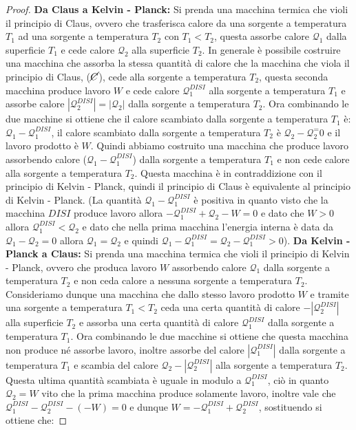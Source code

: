     \begin{proof}
        \textbf{Da Claus a Kelvin - Planck:} Si prenda una macchina termica che violi il principio di Claus, ovvero che trasferisca calore da una sorgente a temperatura $T_1$ ad una sorgente a temperatura $T_2$ con $T_1 < T_2$, questa assorbe calore $\mathcal{Q}_1$ dalla superficie $T_1$ e cede calore $\mathcal{Q}_2$ alla superficie $T_2$. In generale è possibile costruire una macchina che assorba la stessa quantità di calore che la macchina che viola il principio di Claus, ($\cancel{C}$), cede alla sorgente a temperatura $T_2$, questa seconda macchina produce lavoro $W$ e cede calore $\mathcal{Q}_1^{DISI}$ alla sorgente a temperatura $T_1$ e assorbe calore $\left|\mathcal{Q}_2^{DISI}\right| = \left|\mathcal{Q}_2\right|$ dalla sorgente a temperatura $T_2$. Ora combinando le due macchine si ottiene che il calore scambiato dalla sorgente a temperatura $T_1$ è: $\mathcal{Q}_1 - \mathcal{Q}_1^{DISI}$, il calore scambiato dalla sorgente a temperatura $T_2$ è $\mathcal{Q}_2 - \mathcal{Q}_2^ = 0$ e il lavoro prodotto è $W$. Quindi abbiamo costruito una macchina che produce lavoro assorbendo calore ($\mathcal{Q}_1 - \mathcal{Q}_1^{DISI}$) dalla sorgente a temperatura $T_1$ e non cede calore alla sorgente a temperatura $T_2$. Questa macchina è in contraddizione con il principio di Kelvin - Planck, quindi il principio di Claus è equivalente al principio di Kelvin - Planck. (La quantità $\mathcal{Q}_1 - \mathcal{Q}_1^{DISI}$ è positiva in quanto visto che la macchina $DISI$ produce lavoro allora $-\mathcal{Q}_1^{DISI}+\mathcal{Q}_2-W=0$ e dato che $W>0$ allora $\mathcal{Q}_1^{DISI} < \mathcal{Q}_2$ e dato che nella prima macchina l'energia interna è data da $\mathcal{Q}_1 - \mathcal{Q}_2 = 0$ allora $\mathcal{Q}_1 = \mathcal{Q}_2$ e quindi $\mathcal{Q}_1 - \mathcal{Q}_1^{DISI} = \mathcal{Q}_2 - \mathcal{Q}_1^{DISI} > 0$).\newline
        \textbf{Da Kelvin - Planck a Claus:} Si prenda una macchina termica che violi il principio di Kelvin - Planck, ovvero che produca lavoro $W$ assorbendo calore $\mathcal{Q}_1$ dalla sorgente a temperatura $T_2$ e non ceda calore a nessuna sorgente a temperatura $T_2$. Consideriamo dunque una macchina che dallo stesso lavoro prodotto $W$ e tramite una sorgente a temperatura $T_1<T_2$ ceda una certa quantità di calore $-\left|\mathcal{Q}_2^{DISI}\right|$ alla superficie $T_2$ e assorba una certa quantità di calore $\mathcal{Q}_1^{DISI}$ dalla sorgente a temperatura $T_1$. Ora combinando le due macchine si ottiene che questa macchina non produce né assorbe lavoro, inoltre assorbe del calore $\left|\mathcal{Q}_1^{DISI}\right|$ dalla sorgente a temperatura $T_1$ e scambia del calore $\mathcal{Q}_2 - \left|\mathcal{Q}_2^{DISI}\right|$ alla sorgente a temperatura $T_2$. Questa ultima quantità scambiata è uguale in modulo a $\mathcal{Q}_1^{DISI}$, ciò in quanto $\mathcal{Q}_2 = W$ vito che la prima macchina produce solamente lavoro, inoltre vale che $\mathcal{Q}_1^{DISI}-\mathcal{Q}_2^{DISI} - (- W) = 0$ e dunque $W= -\mathcal{Q}_1^{DISI} + \mathcal{Q}_2^{DISI}$, sostituendo si ottiene che:

\end{proof}
